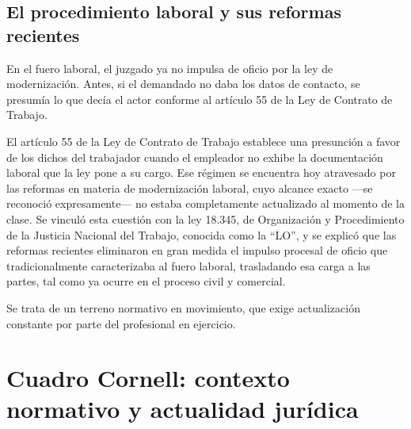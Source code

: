 \documentclass[12pt,oneside]{book}
\begin{document}
\subsection{El procedimiento laboral y sus reformas recientes}

En el fuero laboral, el juzgado ya no impulsa de oficio por la ley de modernización. Antes, si el demandado no daba los datos de contacto, se presumía lo que decía el actor conforme al artículo 55 de la Ley de Contrato de Trabajo.

El artículo 55 de la Ley de Contrato de Trabajo establece una presunción a favor de los dichos del trabajador cuando el empleador no exhibe la documentación laboral que la ley pone a su cargo. Ese régimen se encuentra hoy atravesado por las reformas en materia de modernización laboral, cuyo alcance exacto ---se reconoció expresamente--- no estaba completamente actualizado al momento de la clase. Se vinculó esta cuestión con la ley 18.345, de Organización y Procedimiento de la Justicia Nacional del Trabajo, conocida como la ``LO'', y se explicó que las reformas recientes eliminaron en gran medida el impulso procesal de oficio que tradicionalmente caracterizaba al fuero laboral, trasladando esa carga a las partes, tal como ya ocurre en el proceso civil y comercial.

Se trata de un terreno normativo en movimiento, que exige actualización constante por parte del profesional en ejercicio.

\section*{Cuadro Cornell: contexto normativo y actualidad jurídica}
\end{document}

